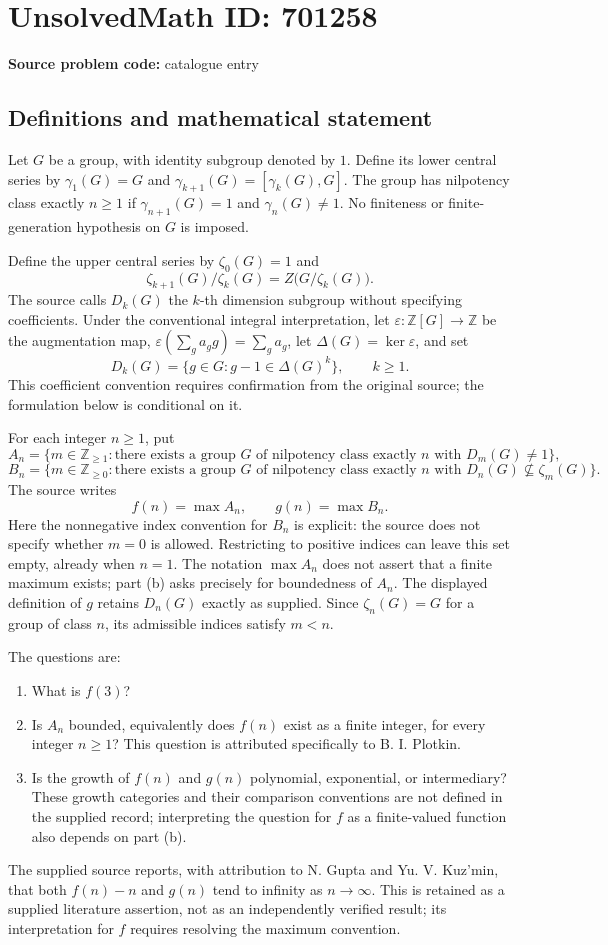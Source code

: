 \documentclass[11pt]{article}
\newcommand{\Z}{\mathbb{Z}}
\begin{document}
\section*{UnsolvedMath ID: 701258}
\textbf{Source problem code:} catalogue entry
\subsection{Definitions and mathematical statement}
Let \(G\) be a group, with identity subgroup denoted by \(1\). Define its lower central series by \(\gamma_1(G)=G\) and \(\gamma_{k+1}(G)=[\gamma_k(G),G]\). The group has nilpotency class exactly \(n\geq 1\) if \(\gamma_{n+1}(G)=1\) and \(\gamma_n(G)\neq 1\). No finiteness or finite-generation hypothesis on \(G\) is imposed.

Define the upper central series by \(\zeta_0(G)=1\) and
\[
\zeta_{k+1}(G)/\zeta_k(G)=Z\bigl(G/\zeta_k(G)\bigr).
\]
The source calls \(D_k(G)\) the \(k\)-th dimension subgroup without specifying coefficients. Under the conventional integral interpretation, let \(\varepsilon:\Z[G]\to\Z\) be the augmentation map, \(\varepsilon(\sum_g a_g g)=\sum_g a_g\), let \(\Delta(G)=\ker\varepsilon\), and set
\[
D_k(G)=\{g\in G:g-1\in\Delta(G)^k\},\qquad k\geq 1.
\]
This coefficient convention requires confirmation from the original source; the formulation below is conditional on it.

For each integer \(n\geq 1\), put
\[
A_n=\{m\in\Z_{\geq 1}:\text{there exists a group }G\text{ of nilpotency class exactly }n\text{ with }D_m(G)\neq 1\},
\]
\[
B_n=\{m\in\Z_{\geq 0}:\text{there exists a group }G\text{ of nilpotency class exactly }n\text{ with }D_n(G)\not\subseteq\zeta_m(G)\}.
\]
The source writes
\[
f(n)=\max A_n,\qquad g(n)=\max B_n.
\]
Here the nonnegative index convention for \(B_n\) is explicit: the source does not specify whether \(m=0\) is allowed. Restricting to positive indices can leave this set empty, already when \(n=1\). The notation \(\max A_n\) does not assert that a finite maximum exists; part (b) asks precisely for boundedness of \(A_n\). The displayed definition of \(g\) retains \(D_n(G)\) exactly as supplied. Since \(\zeta_n(G)=G\) for a group of class \(n\), its admissible indices satisfy \(m<n\).

The questions are:
\begin{enumerate}
\item[(a)] What is \(f(3)\)?
\item[(b)] Is \(A_n\) bounded, equivalently does \(f(n)\) exist as a finite integer, for every integer \(n\geq 1\)? This question is attributed specifically to B. I. Plotkin.
\item[(c)] Is the growth of \(f(n)\) and \(g(n)\) polynomial, exponential, or intermediary? These growth categories and their comparison conventions are not defined in the supplied record; interpreting the question for \(f\) as a finite-valued function also depends on part (b).
\end{enumerate}
The supplied source reports, with attribution to N. Gupta and Yu. V. Kuz'min, that both \(f(n)-n\) and \(g(n)\) tend to infinity as \(n\to\infty\). This is retained as a supplied literature assertion, not as an independently verified result; its interpretation for \(f\) requires resolving the maximum convention.
\end{document}
